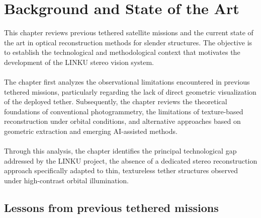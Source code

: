 \chapter{Background and State of the Art}

This chapter reviews previous tethered satellite missions and the current state of the art in optical reconstruction methods for slender structures. The objective is to establish the technological and methodological context that motivates the development of the LINKU stereo vision system.
\\\\
The chapter first analyzes the observational limitations encountered in previous tethered missions, particularly regarding the lack of direct geometric visualization of the deployed tether. Subsequently, the chapter reviews the theoretical foundations of conventional photogrammetry, the limitations of texture-based reconstruction under orbital conditions, and alternative approaches based on geometric extraction and emerging AI-assisted methods.
\\\\
Through this analysis, the chapter identifies the principal technological gap addressed by the LINKU project, the absence of a dedicated stereo reconstruction approach specifically adapted to thin, textureless tether structures observed under high-contrast orbital illumination.

\section{Lessons from previous tethered missions}

